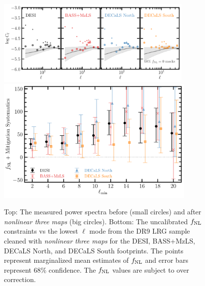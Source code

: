 \begin{figure}
    \centering
    \includegraphics[width=0.85\textwidth]{figures/cldr9_lowell.pdf}
    \includegraphics[width=0.86\textwidth]{figures/fnl_elmin.pdf}  
    \caption{Top: The measured power spectra before (small circles) and after \textit{nonlinear three maps} (big circles). Bottom: The uncalibrated $f_{\rm NL}$ constraints vs the lowest $\ell$ mode from the DR9 LRG sample cleaned with \textit{nonlinear three maps} for the DESI, BASS+MzLS, DECaLS North, and DECaLS South footprints. The points represent marginalized mean estimates of $f_{\rm NL}$ and error bars represent $68$\% confidence. The $f_{\rm NL}$ values are subject to over correction.}\label{fig:mcmc_dr9elmin}
\end{figure}


